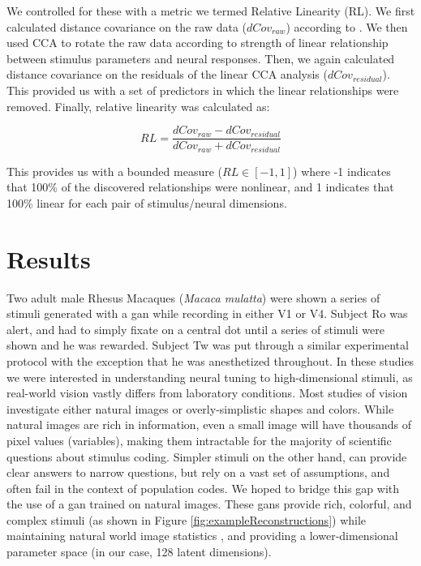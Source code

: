 We controlled for these with a metric we termed Relative Linearity (RL). We first calculated distance covariance on the raw data ($dCov_{raw}$) according to \cite{Cowley2017}. We then used CCA to rotate the raw data according to strength of linear relationship between stimulus parameters and neural responses. Then, we again calculated distance covariance on the residuals of the linear CCA analysis ($dCov_{residual}$). This provided us with a set of predictors in which the linear relationships were removed. Finally, relative linearity was calculated as:

\begin{equation}
	RL = \frac{dCov_{raw} - dCov_{residual}}{dCov_{raw} + dCov_{residual}}
\end{equation}

This provides us with a bounded measure ($RL \in [-1, 1]$) where -1 indicates that 100\% of the discovered relationships were nonlinear, and 1 indicates that 100\% linear for each pair of stimulus/neural dimensions.

\section{Results}
\glsresetall
Two adult male Rhesus Macaques (\textit{Macaca mulatta}) were shown a series of stimuli generated with a \gls{gan} while recording in either V1 or V4. Subject Ro was alert, and had to simply fixate on a central dot until a series of stimuli were shown and he was rewarded. Subject Tw was put through a similar experimental protocol with the exception that he was anesthetized throughout. In these studies we were interested in understanding neural tuning to high-dimensional stimuli, as real-world vision vastly differs from laboratory conditions. Most studies of vision investigate either natural images or overly-simplistic shapes and colors. While natural images are rich in information, even a small image will have thousands of pixel values (variables), making them intractable for the majority of scientific questions about stimulus coding. Simpler stimuli on the other hand, can provide clear answers to narrow questions, but rely on a vast set of assumptions, and often fail in the context of population codes. We hoped to bridge this gap with the use of a \gls{gan} trained on natural images. These \gls{gan}s provide rich, colorful, and complex stimuli (as shown in Figure \ref{fig:exampleReconstructions}) while maintaining natural world image statistics \parencite{Fruend2018}, and providing a lower-dimensional parameter space (in our case, 128 latent dimensions).



